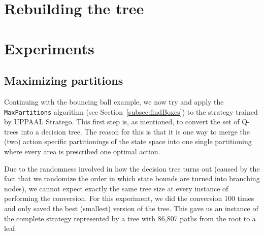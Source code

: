 \documentclass{article}
\begin{document}
\begin{algorithm}[ht]
\begin{algorithmic}[1]

                    \item[]%
                    \EndFor%

                \EndIf%

            \EndFor%
        \EndWhile%


        \EndFunction%
    \end{algorithmic}

\end{algorithm}



\section{Rebuilding the tree}%
\label{sec:rebuildTree}

\lipsum[5]


\section{Experiments}%
\label{sec:experiments}

\subsection{Maximizing partitions}%
\label{subsec:experimentsMaxParts}

Continuing with the bouncing ball example, we now try and apply the
\texttt{MaxPartitions} algorithm (see Section~\ref{subsec:findBoxes}) to the
strategy trained by UPPAAL Stratego.  This first step is, as mentioned, to
convert the set of Q-trees into a decision tree. The reason for this is that it
is one way to merge the (two) action specific partitionings of the state space
into one single partitioning where every area is prescribed one optimal action.

Due to the randomness involved in how the decision tree turns out (caused by the
fact that we randomize the order in which state bounds are turned into branching
nodes), we cannot expect exactly the same tree size at every instance of
performing the conversion. For this experiment, we did the conversion 100 times
and only saved the best (smallest) version of the tree. This gave us an instance
of the complete strategy represented by a tree with 86,807 paths from the root
to a leaf.
\end{document}

